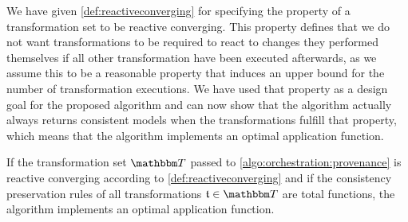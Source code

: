 We have given \autoref{def:reactiveconverging} for specifying the property of a transformation set to be reactive converging.
This property defines that we do not want transformations to be required to react to changes they performed themselves if all other transformation have been executed afterwards, as we assume this to be a reasonable property that induces an upper bound for the number of transformation executions.
We have used that property as a design goal for the proposed algorithm and can now show that the algorithm actually always returns consistent models when the transformations fulfill that property, which means that the algorithm implements an optimal application function.

\begin{theorem}
    If the transformation set $\transformationset{T}$ passed to \autoref{algo:orchestration:provenance} is reactive converging according to \autoref{def:reactiveconverging} and if the consistency preservation rules of all transformations $\transformation{t} \in \transformationset{T}$ are total functions, the algorithm implements an optimal application function.
\end{theorem}
